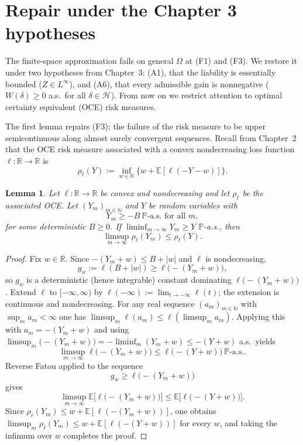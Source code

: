 \documentclass[11pt,a4paper]{report}
\numberwithin{equation}{chapter}
\theoremstyle{plain}
\newtheorem{lemma}[proposition]{Lemma}
\theoremstyle{definition}
\newcommand{\E}{\mathbb{E}}
\newcommand{\PP}{\mathbb{P}}
\newcommand{\R}{\mathbb{R}}
\newcommand{\N}{\mathbb{N}}
\newcommand{\HH}{\mathcal{H}}
\newcommand{\as}{\ \PP\text{-a.s.}}
\begin{document}
\section{Repair under the Chapter 3 hypotheses}
\label{sec:repair}

The finite-space approximation fails on general $\Omega$ at (F1) and
(F3). We restore it under two hypotheses from Chapter~3: (A1), that the
liability is essentially bounded ($Z\in L^\infty$), and (A6), that every
admissible gain is nonnegative ($W(\delta)\ge0$ a.s.\ for all
$\delta\in\HH$). From now on we restrict attention to optimal certainty equivalent (OCE) risk measures.

The first lemma repairs (F3); the failure of the risk measure to be
upper semicontinuous along almost surely convergent sequences. Recall from Chapter~2 that the OCE risk measure associated with a convex nondecreasing loss
function $\ell:\R\to\R$ is
\[
  \rho_\ell(Y):=\inf_{w\in\R}\bigl\{w+\E[\ell(-Y-w)]\bigr\}.
\]

\begin{lemma}\label{lem:usc}
  Let $\ell:\R\to\R$ be convex and nondecreasing and let $\rho_\ell$ be
  the associated OCE. Let $(Y_m)_{m\in\N}$ and $Y$ be random variables
  with
  \[
    Y_m\ge-B\as\text{ for all }m,
  \]
  for some deterministic $B\ge0$. If $\liminf_{m\to\infty}Y_m\ge Y$
  $\PP$-a.s., then
  \[
    \limsup_{m\to\infty}\rho_\ell(Y_m)\le\rho_\ell(Y).
  \]
\end{lemma}

\begin{proof}
  Fix $w\in\R$. Since $-(Y_m+w)\le B+|w|$ and $\ell$ is nondecreasing,
  \[
    g_w:=\ell(B+|w|)\ge\ell\bigl(-(Y_m+w)\bigr),
  \]
  so $g_w$ is a deterministic (hence integrable) constant dominating
  $\ell\bigl(-(Y_m+w)\bigr)$. Extend $\ell$ to
  $[-\infty,\infty)$ by $\ell(-\infty):=\lim_{t\to-\infty}\ell(t)$; the
  extension is continuous and nondecreasing. For any real sequence
  $(a_m)_{m\in\N}$ with $\sup_m a_m<\infty$ one has
  $\limsup_m\ell(a_m)\le\ell(\limsup_m a_m)$. Applying this with
  $a_m=-(Y_m+w)$ and using
  $\limsup_m\bigl(-(Y_m+w)\bigr)=-\liminf_m(Y_m+w)\le-(Y+w)$ a.s.\ yields
  \[
    \limsup_{m\to\infty}\ell\bigl(-(Y_m+w)\bigr)\le\ell\bigl(-(Y+w)\bigr)\as.
  \]
  Reverse Fatou applied to the sequence
  \[
    g_w\ge\ell\bigl(-(Y_m+w)\bigr)
  \]
  gives
  \[
    \limsup_{m\to\infty}\E\bigl[\ell\bigl(-(Y_m+w)\bigr)\bigr]
    \le\E\bigl[\ell\bigl(-(Y+w)\bigr)\bigr].
  \]
  Since $\rho_\ell(Y_m)\le w+\E[\ell(-(Y_m+w))]$, one obtains
  $\limsup_m\rho_\ell(Y_m)\le w+\E[\ell(-(Y+w))]$ for every $w$, and
  taking the infimum over $w$ completes the proof.
\end{proof}
\end{document}
